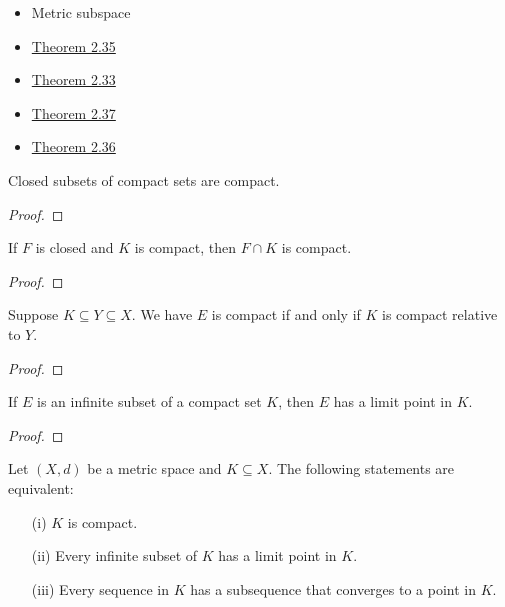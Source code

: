\documentclass[a4paper]{report}
\begin{document}
\begin{itemize}
    \item Metric subspace
    \item {\hyperref[Theorem 2.35]{Theorem 2.35}} 
    \item {\hyperref[Theorem 2.33]{Theorem 2.33}} 
    \item {\hyperref[Theorem 2.37]{Theorem 2.37}} 
    \item {\hyperref[Theorem 2.36]{Theorem 2.36}} 
\end{itemize}

\begin{theorem}[ ]\label{Theorem 2.35}
    Closed subsets of compact sets are compact.
\end{theorem}
\begin{proof}

\end{proof}

\begin{corollary}
    If \( F  \) is closed and \( K  \) is compact, then \( F \cap K  \) is compact.
\end{corollary}
\begin{proof}

\end{proof}


\begin{theorem}[ ]\label{Theorem 2.33}
    Suppose \( K \subseteq Y \subseteq X  \). We have \( E  \) is compact if and only if \( K  \) is compact relative to \( Y  \).
\end{theorem}
\begin{proof}

\end{proof}

\begin{theorem}[ ]\label{Theorem 2.37}
    If \( E  \) is an infinite subset of a compact set \( K  \), then \( E  \) has a limit point in \( K  \).
\end{theorem}
\begin{proof}

\end{proof}


\begin{remark}
    Let \( (X,d) \) be a metric space and \( K \subseteq X . \) The following statements are equivalent:
    \begin{enumerate}
        \item[(i)] \( K  \) is compact.
        \item[(ii)] Every infinite subset of \( K  \) has a limit point in \( K  \).
        \item[(iii)] Every sequence in \( K  \) has a subsequence that converges to a point in \( K  \).
    \end{enumerate}
\end{remark}
\end{document}
